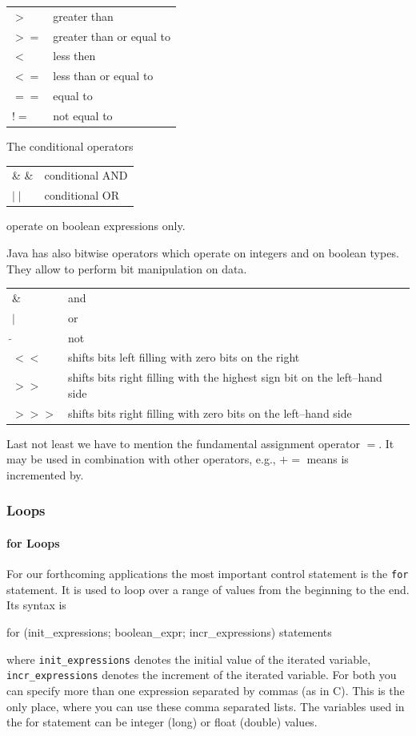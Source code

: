 \begin{center}
\begin{tabular}{ll}
$>$  & greater than \\
$>=$ & greater than or equal to \\
$<$  & less then \\
$<=$ & less than or equal to \\
$==$ & equal to \\
$!=$ & not equal to
\end{tabular}
\end{center}


The conditional operators
\begin{center}
\begin{tabular}{ll}
\& \& & conditional AND      \\
$\mid\mid$ & conditional OR
\end{tabular}
\end{center}
operate on  boolean expressions only.

Java has also bitwise operators which operate on integers and on
boolean types. They allow to perform bit manipulation on data.
\begin{center}
\begin{tabular}{ll}
\& & and \\
$\mid$ & or \\
$\tilde{}$ & not \\
$<<$ &  shifts bits left filling with zero bits on the right \\
$>>$ & shifts bits right filling with the highest sign bit on the
           left--hand side \\
$ >>>$ & shifts bits right filling with zero bits on the left--hand side 
\end{tabular}
\end{center}

Last not least we have to mention the fundamental assignment operator
$=$. It may be used in combination with other operators, e.g., $+=$
means is incremented by.


\subsubsection{Loops}
\paragraph{for Loops}
For our forthcoming applications the most important control statement
is the \verb|for| statement. It is used to loop over a range of values
from the beginning to the end. Its syntax is
\begin{sverbatim}
for (init_expressions; boolean_expr; incr_expressions) {
    statements
}
\end{sverbatim}
where \verb|init_expressions| denotes the initial value of the iterated
variable, \verb|incr_expressions| denotes the increment of the iterated
variable. For both you can specify more than one expression separated
by commas (as in C). This is the only place, where you can use these comma
separated lists. The variables used in the for statement can be 
integer (long) or float (double) values. 

